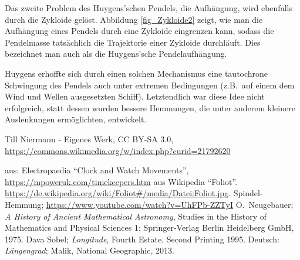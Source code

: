 Das zweite Problem des Huygens'schen Pendels, die Aufh\"angung, wird ebenfalls durch die Zykloide
gel\"ost. 
Abbildung \ref{fig_Zykloide2} zeigt, wie man die Aufh\"angung eines Pendels durch eine Zykloide
eingrenzen kann, sodass die Pendelmasse tats\"achlich die Trajektorie einer Zykloide durchl\"auft. 
Dies bezeichnet man auch als die Huygens'sche Pendelaufh\"angung.


Huygens erhoffte sich durch einen solchen Mechanismus
eine tautochrone Schwingung des Pendels auch unter extremen Bedingungen (z.B.\ auf einem
dem Wind und Wellen ausgesetzten Schiff). Letztendlich war diese Idee nicht erfolgreich, statt dessen wurden bessere
Hemmungen, die unter anderem kleinere Auslenkungen erm\"oglichten, entwickelt. 

\begin{thebibliography}{99}

Till Niermann - Eigenes Werk, CC BY-SA 3.0, \url{https://commons.wikimedia.org/w/index.php?curid=21792620}

 aus: Electropaedia ``Clock and Watch Movements'', 
           \url{https://mpoweruk.com/timekeepers.htm}
 aus Wikipedia ``Foliot''. \url{https://de.wikipedia.org/wiki/Foliot#/media/Datei:Foliot.jpg}.
 Spindel-Hemmung; \url{https://www.youtube.com/watch?v=UhFPb-ZZTyI}
 O.\ Neugebauer; \textit{A History of Ancient Mathematical Astronomy}, 
       Studies in the History of Mathematics and Physical Sciences 1; Springer-Verlag Berlin
       Heidelberg GmbH, 1975.
 Dava Sobel; \textit{Longitude}, Fourth Estate, Second Printing 1995. Deutsch: \textit{L\"angengrad};
                  Malik, National Geographic, 2013.        
\end{thebibliography}

%

